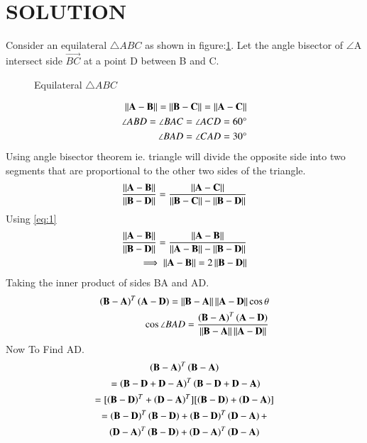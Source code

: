 \documentclass[journal,12pt,twocolumn]{IEEEtran}
\begin{document}
\section{SOLUTION}
Consider an equilateral $\triangle{ABC}$ as shown in figure:\ref{fig:es1}. Let the angle bisector of $\angle$A intersect side $\vec{BC}$ at a point D between B and C.
\renewcommand{\thefigure}{1}
\begin{figure}[!ht]
    \centering
    \resizebox{7cm}{!}{}
    \caption{Equilateral $\triangle{ABC}$}
    \label{fig:es1}
\end{figure}
\begin{align}\label{eq:solutions/1/1/11}
\label{eq:1}\left\lVert\mathbf{A-B}\right\rVert=\left\lVert\mathbf{B-C}\right\rVert=\left\lVert\mathbf{A-C}\right\rVert\\
\angle ABD = \angle BAC = \angle ACD = 60\degree\\
\angle BAD = \angle CAD = 30\degree
\end{align}
Using angle bisector theorem ie. triangle will divide the opposite side into two segments that are proportional to the other two sides of the triangle.\\
\begin{align}
    \frac{\left\lVert\mathbf{A-B}\right\rVert}{\left\lVert\mathbf{B-D}\right\rVert}= \frac{\left\lVert\mathbf{A-C}\right\rVert}{\left\lVert\mathbf{B-C}\right\rVert-\left\lVert\mathbf{B-D}\right\rVert}
\end{align}
Using \eqref{eq:1}
\begin{align}
     \frac{\left\lVert\mathbf{A-B}\right\rVert}{\left\lVert\mathbf{B-D}\right\rVert}= \frac{\left\lVert\mathbf{A-B}\right\rVert}{\left\lVert\mathbf{A-B}\right\rVert-\left\lVert\mathbf{B-D}\right\rVert}\\
     \implies\left\lVert\mathbf{A-B}\right\rVert = 2\left\lVert\mathbf{B-D}\right\rVert\label{eq:es22}
\end{align}
Taking the inner product of sides BA and AD.
\begin{align}
    \left(\mathbf{B}-\mathbf{A}\right)^T\left(\mathbf{A}-\mathbf{D}\right) =
    \left\lVert\mathbf{B}-\mathbf{A}\right\rVert\left\lVert\mathbf{A}-\mathbf{D}\right\rVert\cos{\theta}\\
    \cos{\angle BAD}=\frac{\left(\mathbf{B}-\mathbf{A}\right)^T\left(\mathbf{A}-\mathbf{D}\right)}{\left\lVert\mathbf{B}-\mathbf{A}\right\rVert\left\lVert\mathbf{A}-\mathbf{D}\right\rVert}\label{eq:13}
\end{align}
%
%
%
Now To Find AD.
\begin{multline}
 \brak{\vec{B-A}}^{T}\brak{\vec{B-A}}\\\ =\brak{\vec{B-D+D-A}}^{T}\brak{\vec{B-D+D-A}}\\
 = [\brak{\vec{B-D}}^{T}+\brak{\vec{D-A}}^{T}][\brak{\vec{B-D}}+\brak{\vec{D-A}}]\\
 =\brak{\vec{B-D}}^{T}\brak{\vec{B-D}} + \brak{\vec{B-D}}^{T}\brak{\vec{D-A}} +\\ \brak{\vec{D-A}}^{T}\brak{\vec{B-D}} + \brak{\vec{D-A}}^{T}\brak{\vec{D-A}}
\end{multline}
\end{document}
